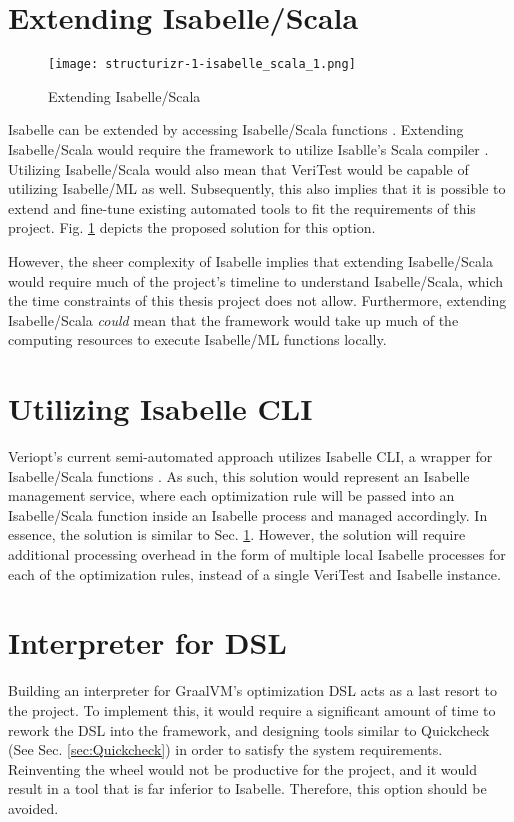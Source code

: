 \section{Extending Isabelle/Scala}
\label{sec:IsabelleScala}

\begin{figure}[h]
      \centering
      \texttt{[image: structurizr-1-isabelle\_scala\_1.png]}
      \caption{Extending Isabelle/Scala}
      \label{fig:IsabelleScala}
\end{figure}

Isabelle can be extended by accessing Isabelle/Scala functions \cite[Ch. 5]{isabelleSystem}. Extending Isabelle/Scala would require the framework 
to utilize Isablle's Scala compiler \cite[Sec. 5.1.4]{isabelleSystem}. Utilizing Isabelle/Scala would also mean that VeriTest would be capable of 
utilizing Isabelle/ML as well. Subsequently, this also implies that it is possible to extend and fine-tune existing automated tools to fit the 
requirements of this project. Fig. \ref{fig:IsabelleScala} depicts the proposed solution for this option.

However, the sheer complexity of Isabelle implies that extending Isabelle/Scala would require much of the 
project's timeline to understand Isabelle/Scala, which the time constraints of this thesis project does not allow. 
Furthermore, extending Isabelle/Scala \emph{could} mean that the framework would take up much of the computing resources to execute 
Isabelle/ML functions locally.

\section{Utilizing Isabelle CLI}
\label{sec:IsabelleCLI}

Veriopt's current semi-automated approach \cite[Sec. 5.1]{Term_Graph_Optimizations} utilizes Isabelle CLI, a wrapper for Isabelle/Scala functions 
\cite{IsabelleHOL}. As such, this solution would represent an Isabelle management service, where each optimization rule will be passed into an 
Isabelle/Scala function inside an Isabelle process and managed accordingly. In essence, the solution is similar to Sec. \ref{sec:IsabelleScala}. 
However, the solution will require additional processing overhead in the form of multiple local Isabelle processes for each of the optimization rules, 
instead of a single VeriTest and Isabelle instance.

\section{Interpreter for DSL}
\label{sec:DSLInterpreter}

Building an interpreter for GraalVM's optimization DSL acts as a last resort to the project. To implement this, it would require a significant 
amount of time to rework the DSL into the framework, and designing tools similar to Quickcheck (See Sec. \ref{sec:Quickcheck}) in order to satisfy the 
system requirements. Reinventing the wheel would not be productive for the project, and it would result in a tool that is far inferior to Isabelle.
Therefore, this option should be avoided.
